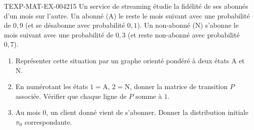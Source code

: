 \begin{exercice}{TEXP-MAT-EX-004}{2}{15}
Un service de streaming étudie la fidélité de ses abonnés d'un mois sur l'autre. Un abonné (A) le reste le mois suivant avec une probabilité de $0{,}9$ (et se désabonne avec probabilité $0{,}1$). Un non-abonné (N) s'abonne le mois suivant avec une probabilité de $0{,}3$ (et reste non-abonné avec probabilité $0{,}7$).
\begin{enumerate}
  \item Représenter cette situation par un graphe orienté pondéré à deux états A et N.
  \item En numérotant les états $1=$A, $2=$N, donner la matrice de transition $P$ associée. Vérifier que chaque ligne de $P$ somme à $1$.
  \item Au mois $0$, un client donné vient de s'abonner. Donner la distribution initiale $\pi_0$ correspondante.
\end{enumerate}
\end{exercice}
